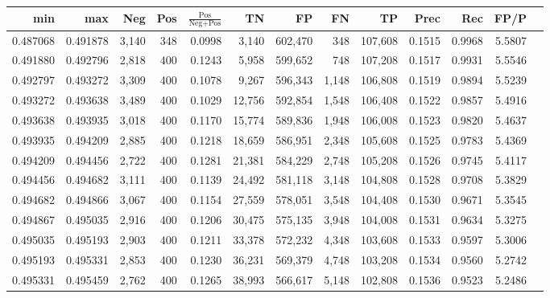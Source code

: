 \begin{tabular}{rrrrrrrrrrrrr}
\toprule
     min &      max &   Neg & Pos & $\frac{\text{Pos}}{\text{Neg}+\text{Pos}}$ &      TN &      FP &      FN &      TP &   Prec &    Rec &   FP/P \\
\midrule
0.487068 & 0.491878 & 3,140 & 348 &                                     0.0998 &   3,140 & 602,470 &     348 & 107,608 & 0.1515 & 0.9968 & 5.5807 \\
0.491880 & 0.492796 & 2,818 & 400 &                                     0.1243 &   5,958 & 599,652 &     748 & 107,208 & 0.1517 & 0.9931 & 5.5546 \\
0.492797 & 0.493272 & 3,309 & 400 &                                     0.1078 &   9,267 & 596,343 &   1,148 & 106,808 & 0.1519 & 0.9894 & 5.5239 \\
0.493272 & 0.493638 & 3,489 & 400 &                                     0.1029 &  12,756 & 592,854 &   1,548 & 106,408 & 0.1522 & 0.9857 & 5.4916 \\
0.493638 & 0.493935 & 3,018 & 400 &                                     0.1170 &  15,774 & 589,836 &   1,948 & 106,008 & 0.1523 & 0.9820 & 5.4637 \\
0.493935 & 0.494209 & 2,885 & 400 &                                     0.1218 &  18,659 & 586,951 &   2,348 & 105,608 & 0.1525 & 0.9783 & 5.4369 \\
0.494209 & 0.494456 & 2,722 & 400 &                                     0.1281 &  21,381 & 584,229 &   2,748 & 105,208 & 0.1526 & 0.9745 & 5.4117 \\
0.494456 & 0.494682 & 3,111 & 400 &                                     0.1139 &  24,492 & 581,118 &   3,148 & 104,808 & 0.1528 & 0.9708 & 5.3829 \\
0.494682 & 0.494866 & 3,067 & 400 &                                     0.1154 &  27,559 & 578,051 &   3,548 & 104,408 & 0.1530 & 0.9671 & 5.3545 \\
0.494867 & 0.495035 & 2,916 & 400 &                                     0.1206 &  30,475 & 575,135 &   3,948 & 104,008 & 0.1531 & 0.9634 & 5.3275 \\
0.495035 & 0.495193 & 2,903 & 400 &                                     0.1211 &  33,378 & 572,232 &   4,348 & 103,608 & 0.1533 & 0.9597 & 5.3006 \\
0.495193 & 0.495331 & 2,853 & 400 &                                     0.1230 &  36,231 & 569,379 &   4,748 & 103,208 & 0.1534 & 0.9560 & 5.2742 \\
0.495331 & 0.495459 & 2,762 & 400 &                                     0.1265 &  38,993 & 566,617 &   5,148 & 102,808 & 0.1536 & 0.9523 & 5.2486 \\

\end{tabular}
